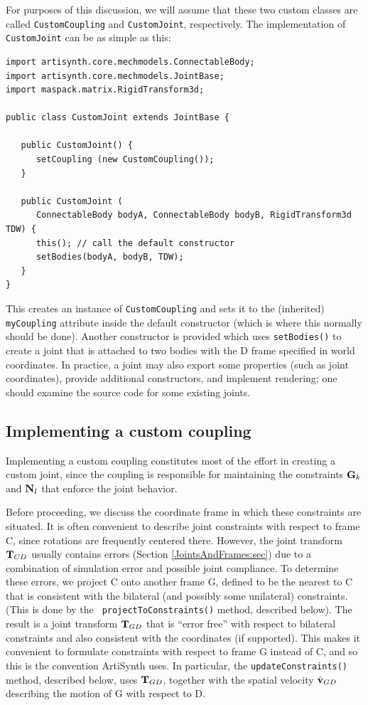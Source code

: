 For purposes of this discussion, we will assume that these two custom
classes are called {\tt CustomCoupling} and {\tt CustomJoint},
respectively. The implementation of {\tt CustomJoint} can be as simple
as this:
%
\begin{lstlisting}[]
import artisynth.core.mechmodels.ConnectableBody;
import artisynth.core.mechmodels.JointBase;
import maspack.matrix.RigidTransform3d;

public class CustomJoint extends JointBase {

   public CustomJoint() {
      setCoupling (new CustomCoupling());
   }

   public CustomJoint (
      ConnectableBody bodyA, ConnectableBody bodyB, RigidTransform3d TDW) {
      this(); // call the default constructor
      setBodies(bodyA, bodyB, TDW);
   }
}
\end{lstlisting}
%
This creates an instance of {\tt CustomCoupling} and sets it to the
(inherited) {\tt myCoupling} attribute inside the default constructor
(which is where this normally should be done). Another constructor is
provided which uses {\tt setBodies()} to create a joint that is
attached to two bodies with the D frame specified in world
coordinates. In practice, a joint may also export some properties
(such as joint coordinates), provide additional constructors, and
implement rendering; one should examine the source code for some
existing joints.

\subsection{Implementing a custom coupling}
\label{CustomCoupling:sec}

Implementing a custom coupling constitutes most of the effort in
creating a custom joint, since the coupling is responsible for
maintaining the constraints ${\bf G}_k$ and ${\bf N}_l$ that enforce the joint
behavior.

Before proceeding, we discuss the coordinate frame in which these
constraints are situated. It is often convenient to describe joint
constraints with respect to frame C, since rotations are frequently
centered there. However, the joint transform ${\bf T}_{CD}$ usually
contains errors (Section \ref{JointsAndFrames:sec}) due to a
combination of simulation error and possible joint compliance. To
determine these errors, we project C onto another frame G, defined to
be the nearest to C that is consistent with the bilateral (and possibly
some unilateral) constraints. (This is done by the {\tt
projectToConstraints()} method, described below).  The result is a
joint transform ${\bf T}_{GD}$ that is ``error free'' with respect to
bilateral constraints and also consistent with the coordinates (if
supported). This makes it convenient to formulate constraints with
respect to frame G instead of C, and so this is the convention
ArtiSynth uses. In particular, the {\tt updateConstraints()} method,
described below, uses ${\bf T}_{GD}$, together with the spatial velocity
$\hat{{\bf v}}_{GD}$ describing the motion of G with respect to D.

